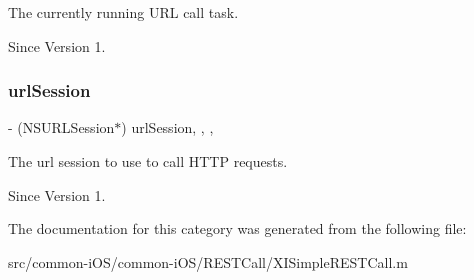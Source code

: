 The currently running U\+RL call task. 

\begin{DoxySince}{Since}
Version 1. 
\end{DoxySince}
\hypertarget{category_x_i_simple_r_e_s_t_call_07_08_abbcaa23c8ae325fb2a3b17b1b00402f9}{}\label{category_x_i_simple_r_e_s_t_call_07_08_abbcaa23c8ae325fb2a3b17b1b00402f9} 
\subsubsection{\texorpdfstring{url\+Session}{urlSession}}
{\footnotesize\ttfamily -\/ (N\+S\+U\+R\+L\+Session$\ast$) url\+Session\hspace{0.3cm}{\ttfamily [read]}, {\ttfamily [write]}, {\ttfamily [nonatomic]}, {\ttfamily [weak]}}



The url session to use to call H\+T\+TP requests. 

\begin{DoxySince}{Since}
Version 1. 
\end{DoxySince}


The documentation for this category was generated from the following file\+:\begin{DoxyCompactItemize}
\item 
src/common-\/i\+O\+S/common-\/i\+O\+S/\+R\+E\+S\+T\+Call/X\+I\+Simple\+R\+E\+S\+T\+Call.\+m\end{DoxyCompactItemize}
